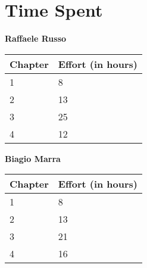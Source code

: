 \section{Time Spent}
\vspace{2\baselineskip}

{\textbf{Raffaele Russo}}
\vspace{5pt}
\newline
\begin{tabular}{|p{7.5cm}|p{7.5cm}|}
\hline
\textbf{Chapter} & \textbf{Effort (in hours)} \\
\hline
1 & 8 \\
\hline
2 & 13 \\
\hline
3 & 25 \\
\hline
4 & 12 \\
\hline
\end{tabular}

\vspace{2\baselineskip}

{\textbf{Biagio Marra}}
\vspace{5pt}
\newline
\begin{tabular}{|p{7.5cm}|p{7.5cm}|}
\hline
\textbf{Chapter} & \textbf{Effort (in hours)} \\
\hline
1 & 8 \\
\hline
2 & 13 \\
\hline
3 & 21 \\
\hline
4 & 16 \\
\hline
\end{tabular}